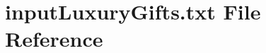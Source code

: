 \hypertarget{inputLuxuryGifts_8txt}{}\section{input\+Luxury\+Gifts.\+txt File Reference}
\label{inputLuxuryGifts_8txt}
